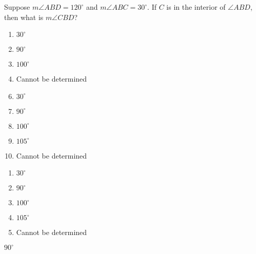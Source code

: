 


  Suppose $m\angle ABD = 120^\circ$ and $m\angle ABC = 30^\circ$. If $C$ is in the interior of $\angle ABD$, then  what is $m\angle CBD$? 


\ifsat
	\begin{enumerate}[label=\Alph*)]
		\item   $30^\circ$
		\item  $90^\circ$%
		\item $100^\circ$
		\item  Cannot be determined
	\end{enumerate}
\else
\fi

\ifacteven
	\begin{enumerate}[label=\textbf{\Alph*.},itemsep=\fill,align=left]
		\setcounter{enumii}{5}
		\item   $30^\circ$
		\item  $90^\circ$%
		\item $100^\circ$
		\addtocounter{enumii}{1}
		\item $105^\circ$ 
		\item  Cannot be determined
	\end{enumerate}
\else
\fi

\ifactodd
	\begin{enumerate}[label=\textbf{\Alph*.},itemsep=\fill,align=left]
		\item   $30^\circ$
		\item  $90^\circ$%
		\item $100^\circ$
		\item $105^\circ$ 
		\item  Cannot be determined
	\end{enumerate}
\else
\fi

\ifgridin
  $90^\circ$%
		
\else
\fi

